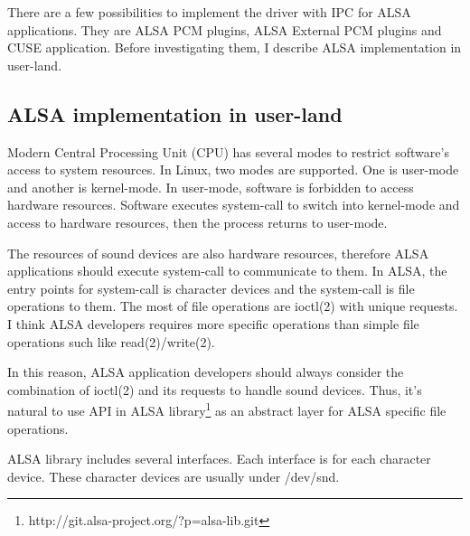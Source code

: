 \documentclass[onecolumn]{article}
\begin{document}
There are a few possibilities to implement the driver with IPC for ALSA applications. They are ALSA PCM plugins, ALSA External PCM plugins and CUSE application. Before investigating them, I describe ALSA implementation in user-land.

\subsection{ALSA implementation in user-land}

Modern Central Processing Unit (CPU) has several modes to restrict software's access to system resources. In Linux, two modes are supported. One is user-mode and another is kernel-mode. In user-mode, software is forbidden to access hardware resources. Software executes system-call to switch into kernel-mode and access to hardware resources, then the process returns to user-mode.

The resources of sound devices are also hardware resources, therefore ALSA applications should execute system-call to communicate to them. In ALSA, the entry points for system-call is character devices and the system-call is file operations to them. The most of file operations are ioctl(2) with unique requests. I think ALSA developers requires more specific operations than simple file operations such like read(2)/write(2).

In this reason, ALSA application developers should always consider the combination of ioctl(2) and its requests to handle sound devices. Thus, it's natural to use API in ALSA library\footnote{http://git.alsa-project.org/?p=alsa-lib.git} as an abstract layer for ALSA specific file operations.

ALSA library includes several interfaces. Each interface is for each character device. These character devices are usually under /dev/snd.
\end{document}
